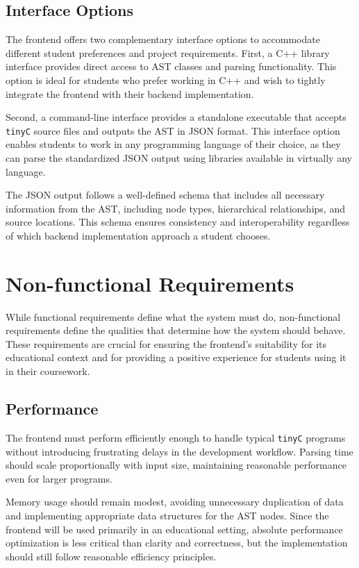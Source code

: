 \subsection{Interface Options}
The frontend offers two complementary interface options to accommodate different student preferences and project requirements. First, a C++ library interface provides direct access to AST classes and parsing functionality. This option is ideal for students who prefer working in C++ and wish to tightly integrate the frontend with their backend implementation.

Second, a command-line interface provides a standalone executable that accepts \texttt{tinyC} source files and outputs the AST in JSON format. This interface option enables students to work in any programming language of their choice, as they can parse the standardized JSON output using libraries available in virtually any language.

The JSON output follows a well-defined schema that includes all necessary information from the AST, including node types, hierarchical relationships, and source locations. This schema ensures consistency and interoperability regardless of which backend implementation approach a student chooses.


\section{Non-functional Requirements}

While functional requirements define what the system must do, non-functional requirements define the qualities that determine how the system should behave. These requirements are crucial for ensuring the frontend's suitability for its educational context and for providing a positive experience for students using it in their coursework.


\subsection{Performance}
The frontend must perform efficiently enough to handle typical \texttt{tinyC} programs without introducing frustrating delays in the development workflow. Parsing time should scale proportionally with input size, maintaining reasonable performance even for larger programs. 

Memory usage should remain modest, avoiding unnecessary duplication of data and implementing appropriate data structures for the AST nodes. Since the frontend will be used primarily in an educational setting, absolute performance optimization is less critical than clarity and correctness, but the implementation should still follow reasonable efficiency principles.


